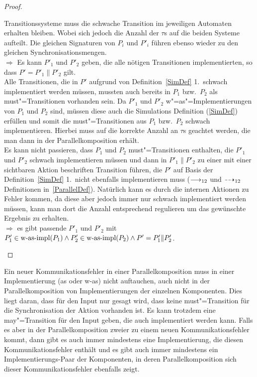 \begin{proof}
\begin{enumerate}
      Transitionssysteme muss die schwache Transition im jeweiligen Automaten
      erhalten bleiben. Wobei sich jedoch die Anzahl der $\tau$s auf die beiden
      Systeme aufteilt. Die gleichen Signaturen von $P_i$ und $P'_i$ führen
      ebenso wieder zu den gleichen Synchronisationsmengen.\\
      $\Rightarrow$ Es kann $P'_1$ und $P'_2$ geben, die alle nötigen
      Transitionen implementierten, so dass $P'=P'_1\|P'_2$ gilt.\\
      Alle Transitionen, die in $P'$ aufgrund von Definition~\ref{SimDef} 1.\
      schwach implementiert werden müssen, mussten auch bereits in $P_1$ bzw.\
      $P_2$ als must"=Transitionen vorhanden sein. Da $P'_1$ und $P'_2$
      w"=as"=Implementierungen von $P_1$ und $P_2$ sind, müssen diese auch die
      Simulations Definition (\ref{SimDef}) erfüllen und somit die
      must"=Transitionen aus $P_1$ bzw.\ $P_2$ schwach implementieren. Hierbei
      muss auf die korrekte Anzahl an $\tau$s geachtet werden, die man dann in
      der Parallelkomposition erhält.\\
      Es kann nicht passieren, dass $P_1$ und $P_2$ must"=Transitionen
      enthalten, die $P'_1$ und $P'_2$ schwach implementieren müssen und dann
      in $P'_1\|P'_2$ zu einer mit einer sichtbaren Aktion beschriften
      Transition führen, die $P'$ auf Basis der Definition~\ref{SimDef} 1.\
      nicht ebenfalls implementieren muss ($\must _{12}$ und $\may _{12}$
      Definitionen in~\ref{ParallelDef}). Natürlich kann es durch die internen
      Aktionen zu Fehler kommen, da diese aber jedoch immer nur schwach
      implementiert werden müssen, kann man dort die Anzahl entsprechend
      regulieren um das gewünschte Ergebnis zu erhalten.\\
      $\Rightarrow$ es gibt passende $P'_1$ und $P'_2$ mit $P'_1\in\mathrm{w}\text{-}\mathrm{as}\text{-}\mathrm{impl} (P_1)
      \land P'_2\in\mathrm{w}\text{-}\mathrm{as}\text{-}\mathrm{impl} (P_2) \land P'=P'_1\|P'_2$.
  \end{enumerate}
\end{proof}

Ein neuer Kommunikationsfehler in einer Parallelkomposition muss in einer
Implementierung (as oder w-as) nicht auftauchen, auch nicht in der
Parallelkomposition von Implementierungen der einzelnen Komponenten. Dies liegt
daran, dass für den Input nur gesagt wird, dass keine must"=Transition für die
Synchronisation der Aktion vorhanden ist. Es kann trotzdem eine
may"=Transition für den Input geben, die auch implementiert werden kann.
Falls es aber in der Parallelkomposition zweier \MEIO{} zu einem neuen
Kommunikationsfehler kommt, dann gibt es auch immer mindestens eine
Implementierung, die diesen Kommunikationsfehler enthält und es gibt auch immer
mindestens ein Implementierungs-Paar der Komponenten, in deren
Parallelkomposition sich dieser Kommunikationsfehler ebenfalls zeigt.
